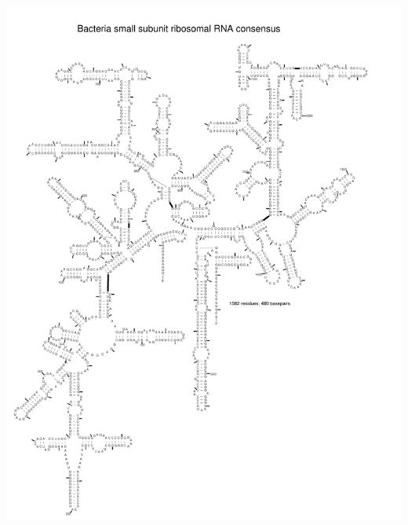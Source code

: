 \begin{center}
\newpage
\includegraphics[height=8.5in]{../../seeds/ss-diagrams/bacteria-0p1}


\end{center}
